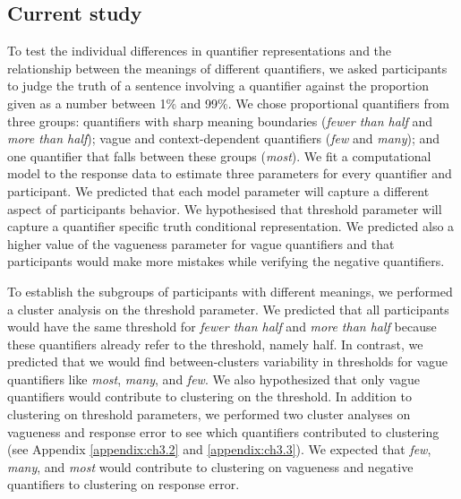 \documentclass{article}
\begin{document}


\subsection{Current study}
To test the individual differences in quantifier representations and the relationship between the meanings of different quantifiers, we asked participants to judge the truth of a sentence involving a quantifier against the proportion given as a number between 1\% and 99\%. We chose proportional quantifiers from three groups: quantifiers with sharp meaning boundaries (\textit{fewer than half} and \textit{more than half}); vague and context-dependent quantifiers (\textit{few} and \textit{many}); and one quantifier that falls between these groups (\textit{most}). We fit a computational model to the response data to estimate three parameters for every quantifier and participant. We predicted that each model parameter will capture a different aspect of participants behavior. We hypothesised that threshold parameter will capture a quantifier specific truth conditional representation. We predicted also a higher value of the vagueness parameter for vague quantifiers and that participants would make more mistakes while verifying the negative quantifiers.

To establish the subgroups of participants with different meanings, we performed a cluster analysis on the threshold parameter. We predicted that all participants would have the same threshold for \textit{fewer than half} and \textit{more than half} because these quantifiers already refer to the threshold, namely half. In contrast, we predicted that we would find between-clusters variability in thresholds for vague quantifiers like \textit{most}, \textit{many}, and \textit{few}. We also hypothesized that only vague quantifiers would contribute to clustering on the threshold. In addition to clustering on threshold parameters, we performed two cluster analyses on vagueness and response error to see which quantifiers contributed to clustering (see Appendix \ref{appendix:ch3.2} and \ref{appendix:ch3.3}). We expected that \textit{few}, \textit{many}, and \textit{most} would contribute to clustering on vagueness and negative quantifiers to clustering on response error. 
\end{document}
